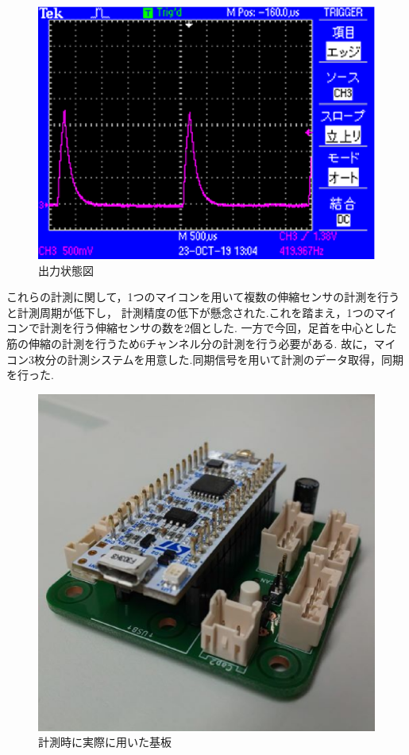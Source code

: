 \begin{figure}[h]
    \begin{center}
     \includegraphics[width=0.5\columnwidth,clip]{Photo/2.実験方法/オシロスコープ.eps}
     \caption{出力状態図}
     \label{オシロスコープ}
    \end{center}
\end{figure}

これらの計測に関して，1つのマイコンを用いて複数の伸縮センサの計測を行うと計測周期が低下し，
計測精度の低下が懸念された.これを踏まえ，1つのマイコンで計測を行う伸縮センサの数を2個とした.
一方で今回，足首を中心とした筋の伸縮の計測を行うため6チャンネル分の計測を行う必要がある.
故に，マイコン3枚分の計測システムを用意した.同期信号を用いて計測のデータ取得，同期を行った.
\begin{figure}[h]
 \begin{center}
  \includegraphics[width=0.5\columnwidth,clip]{Photo/2.実験方法/circuit.eps}
  \caption{計測時に実際に用いた基板}
  \label{circuit}
 \end{center}
\end{figure}
